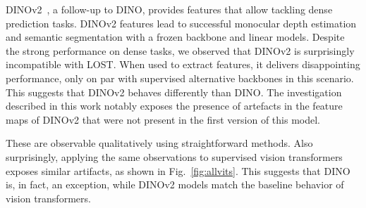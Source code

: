 \documentclass{article} \usepackage{iclr2024_conference,times}
\newcommand{\new}[1]{{#1}}
\newcommand{\old}[1]{}
\begin{document}
DINOv2~\citep{oquab2023dinov2}, a follow-up to DINO, provides features that allow tackling dense prediction tasks.
DINOv2 features \new{lead to successful}\old{strongly perform} monocular depth estimation and semantic segmentation with a frozen backbone and linear models.
Despite the strong performance on dense tasks, we observed that DINOv2 is surprisingly incompatible with LOST.
When used to extract features, it delivers disappointing performance, only on par with supervised alternative backbones in this scenario. 
\new{This suggests that DINOv2 behaves differently than DINO. The investigation described in this work notably exposes the presence of artefacts in the feature maps of DINOv2 that were not present in the first version of this model.}
\old{This suggests that a different behavior was introduced in the learning algorithm, and we set a goal to figure out what happened. 
The investigation described in this work exposes the presence of artifacts in the feature maps of DINOv2 that were not present in DINO.}
These are observable qualitatively using straightforward methods. 
\new{Also surprisingly}, applying the same observations to supervised \old{models}\new{vision transformers} exposes similar artifacts, as shown in Fig.~\ref{fig:allvits}.
This suggests that DINO is, in fact, an exception, while DINOv2 models match the baseline behavior of vision transformers. 
\end{document}
